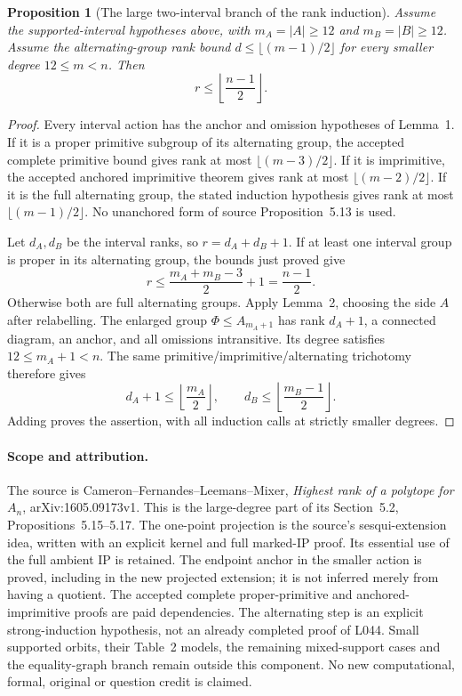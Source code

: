 \documentclass[11pt,a4paper]{article}
\newtheorem{proposition}[lemma]{Proposition}
\begin{document}
\begin{proposition}[The large two-interval branch of the rank induction]
Assume the supported-interval hypotheses above, with
$m_A=|A|\geq12$ and $m_B=|B|\geq12$.
Assume the alternating-group rank bound
$d\leq\lfloor(m-1)/2\rfloor$ for every smaller degree
$12\leq m<n$. Then
\[
                       r\leq\left\lfloor\frac{n-1}{2}\right\rfloor.
\]
\end{proposition}
\begin{proof}
Every interval action has the anchor and omission hypotheses
of Lemma~1. If it is a proper primitive subgroup of its
alternating group, the accepted complete primitive bound gives
rank at most $\lfloor(m-3)/2\rfloor$. If it is imprimitive,
the accepted anchored imprimitive theorem gives rank at most
$\lfloor(m-2)/2\rfloor$. If it is the full alternating group,
the stated induction hypothesis gives rank at most
$\lfloor(m-1)/2\rfloor$. No unanchored form of source
Proposition~5.13 is used.

Let $d_A,d_B$ be the interval ranks, so $r=d_A+d_B+1$.
If at least one interval group is proper in its alternating
group, the bounds just proved give
\[
 r\leq\frac{m_A+m_B-3}{2}+1=\frac{n-1}{2}.
\]
Otherwise both are full alternating groups. Apply Lemma~2,
choosing the side $A$ after relabelling. The enlarged group
$\Phi\leq A_{m_A+1}$ has rank $d_A+1$, a connected diagram,
an anchor, and all omissions intransitive. Its degree satisfies
$12\leq m_A+1<n$. The same primitive/imprimitive/alternating
trichotomy therefore gives
\[
          d_A+1\leq\left\lfloor\frac{m_A}{2}\right\rfloor,
  \qquad d_B\leq\left\lfloor\frac{m_B-1}{2}\right\rfloor.
\]
Adding proves the assertion, with all induction calls at
strictly smaller degrees.
\end{proof}

\paragraph{Scope and attribution.}
The source is Cameron--Fernandes--Leemans--Mixer,
\emph{Highest rank of a polytope for $A_n$},
arXiv:1605.09173v1. This is the large-degree part of its Section~5.2,
Propositions~5.15--5.17. The one-point projection is the
source's sesqui-extension idea, written with an explicit
kernel and full marked-IP proof. Its essential use of the
full ambient IP is retained. The endpoint anchor in the
smaller action is proved, including in the new projected
extension; it is not inferred merely from having a quotient.
The accepted complete proper-primitive and anchored-imprimitive
proofs are paid dependencies. The alternating step is an
explicit strong-induction hypothesis, not an already completed
proof of L044. Small supported orbits, their Table~2 models,
the remaining mixed-support cases and the equality-graph
branch remain outside this component. No new computational,
formal, original or question credit is claimed.
\end{document}

